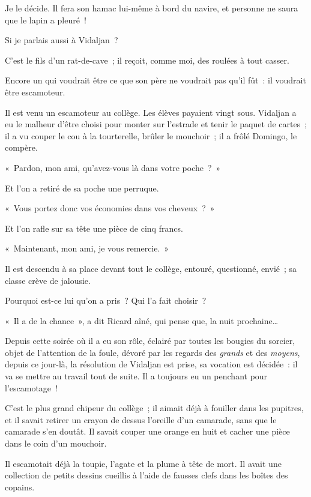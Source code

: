 \documentclass[french,twoside]{book} %
\begin{document}
Je le décide. Il fera son hamac lui-même à bord du navire, et personne ne saura que le lapin a pleuré !\par
\bigbreak
\noindent Si je parlais aussi à Vidaljan ?\par
C’est le fils d’un rat-de-cave ; il reçoit, comme moi, des roulées à tout casser.\par
Encore un qui voudrait être ce que son père ne voudrait pas qu’il fût : il voudrait être escamoteur.\par
Il est venu un escamoteur au collège. Les élèves payaient vingt sous. Vidaljan a eu le malheur d’être choisi pour monter sur l’estrade et tenir le paquet de cartes ; il a vu couper le cou à la tourterelle, brûler le mouchoir ; il a frôlé Domingo, le compère.\par
« Pardon, mon ami, qu’avez-vous là dans votre poche ? »\par
Et l’on a retiré de sa poche une perruque.\par
« Vous portez donc vos économies dans vos cheveux ? »\par
Et l’on rafle sur sa tête une pièce de cinq francs.\par
« Maintenant, mon ami, je vous remercie. »\par
Il est descendu à sa place devant tout le collège, entouré, questionné, envié ; sa classe crève de jalousie.\par
Pourquoi est-ce lui qu’on a pris ? Qui l’a fait choisir ?\par
« Il a de la chance », a dit Ricard aîné, qui pense que, la nuit prochaine…\par
\bigbreak
\noindent Depuis cette soirée où il a eu son rôle, éclairé par toutes les bougies du sorcier, objet de l’attention de la foule, dévoré par les regards des \emph{grands} et des \emph{moyens}, depuis ce jour-là, la résolution de Vidaljan est prise, sa vocation est décidée : il va se mettre au travail tout de suite. Il a toujours eu un penchant pour l’escamotage !\par
C’est le plus grand chipeur du collège ; il aimait déjà à fouiller dans les pupitres, et il savait retirer un crayon de dessus l’oreille d’un camarade, sans que le camarade s’en doutât. Il savait couper une orange en huit et cacher une pièce dans le coin d’un mouchoir.\par
Il escamotait déjà la toupie, l’agate et la plume à tête de mort. Il avait une collection de petits dessins cueillis à l’aide de fausses clefs dans les boîtes des copains.\par
\end{document}

